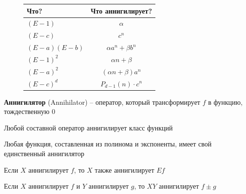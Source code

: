 \documentclass[12pt]{article}
\begin{document}
\begin{itemize}
        \vspace{4mm}

        \begin{minipage}{0.9\textwidth}

            \begin{figure}
        \begin{tabular}{lc}
            \hline

            \hfil Что? & Что аннигилирует? \\

            \hline

            $(E - 1)$ & $\alpha$ \\

            \hline

            $(E - c)$ & $c^n$ \\

            \hline

            $(E - a)(E - b)$ & $\alpha a^n + \beta b^n$ \\

            \hline

            $(E - 1)^2$ & $\alpha n + \beta$ \\

            \hline

            $(E - a)^2$ & $(\alpha n + \beta) a^n$ \\

            \hline

            $(E - c)^d$ & $P_{d - 1}(n) \cdot c^n$ \\

            \hline

        \end{tabular}

        \end{figure}

        \item \textbf{Аннигилятор} (Annihilator) -- оператор, который трансформирует $f$ в функцию, тождественную $0$

        \Notas Любой составной оператор аннигилирует класс функций

        \Notas Любая функция, составленная из полинома и экспоненты, имеет свой единственный аннигилятор

        Если $X$ аннигилирует $f$, то $X$ также аннигилирует $Ef$

        Если $X$ аннигилирует $f$ и $Y$ аннигилирует $g$, то $XY$ аннигилирует $f \pm g$


\end{minipage}
\end{itemize}
\end{document}
